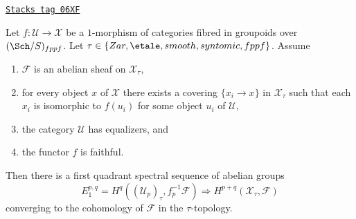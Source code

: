 \begin{lemma}
\label{stacks-sheaves-lemma-cech-to-cohomology}
\href{https://stacks.math.columbia.edu/tag/06XF}{\texttt{Stacks tag 06XF}}

Let $f : \mathcal{U} \to \mathcal{X}$ be a $1$-morphism of categories fibred
in groupoids over $(\Sch/S)_{fppf}$. Let
$\tau \in \{Zar, \etale, smooth, syntomic, fppf\}$.
Assume
\begin{enumerate}
\item $\mathcal{F}$ is an abelian sheaf on $\mathcal{X}_\tau$,
\item for every object $x$ of $\mathcal{X}$ there exists a covering
$\{x_i \to x\}$ in $\mathcal{X}_\tau$ such that each $x_i$ is isomorphic
to $f(u_i)$ for some object $u_i$ of $\mathcal{U}$,
\item the category $\mathcal{U}$ has equalizers, and
\item the functor $f$ is faithful.
\end{enumerate}
Then there is a first quadrant spectral sequence of abelian groups
$$
E_1^{p, q} = H^q((\mathcal{U}_p)_\tau, f_p^{-1}\mathcal{F})
\Rightarrow
H^{p + q}(\mathcal{X}_\tau, \mathcal{F})
$$
converging to the cohomology of $\mathcal{F}$ in the $\tau$-topology.
\end{lemma}

